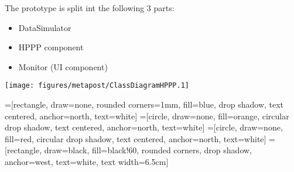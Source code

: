 
 

The prototype is split int the following 3 parts:
\begin{itemize}
	\item DataSimulator
	\item HPPP component
	\item Monitor (UI component)
	\end{itemize}



\texttt{[image: figures/metapost/ClassDiagramHPPP.1]}




=[rectangle, draw=none, rounded corners=1mm, fill=blue, drop shadow,
text centered, anchor=north, text=white]
=[circle, draw=none, fill=orange, circular drop shadow,
text centered, anchor=north, text=white]
=[circle, draw=none, fill=red, circular drop shadow,
text centered, anchor=north, text=white]
=[rectangle, draw=black, fill=black!60, rounded corners, drop shadow,
anchor=west, text=white, text width=6.5cm]





